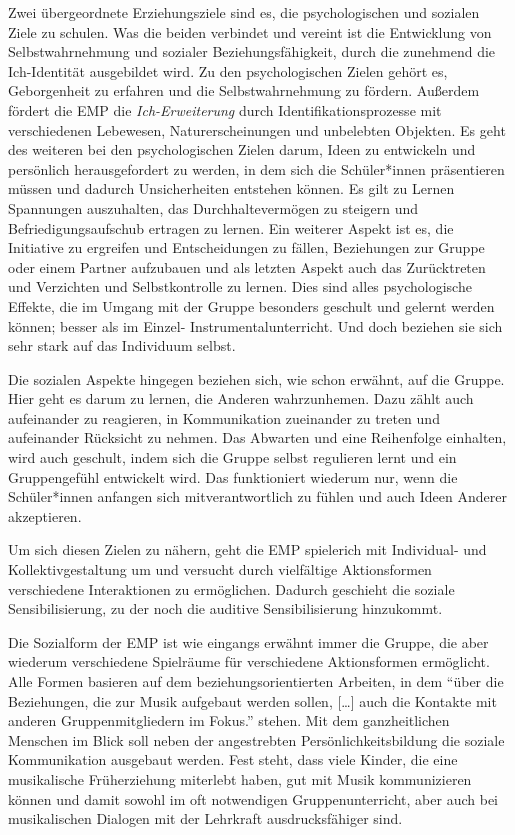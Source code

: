 Zwei übergeordnete Erziehungsziele sind es, die psychologischen und sozialen
Ziele zu schulen. Was die beiden verbindet und vereint ist die Entwicklung von
Selbstwahrnehmung und sozialer Beziehungsfähigkeit, durch die zunehmend die
Ich-Identität ausgebildet wird. Zu den psychologischen Zielen gehört es,
Geborgenheit zu erfahren und die Selbstwahrnehmung zu fördern. Außerdem fördert
die EMP die \emph{Ich-Erweiterung} durch Identifikationsprozesse mit
verschiedenen Lebewesen, Naturerscheinungen und unbelebten Objekten. Es geht des
weiteren bei den psychologischen Zielen darum, Ideen zu entwickeln und
persönlich herausgefordert zu werden, in dem sich die Schüler*innen präsentieren
müssen und dadurch Unsicherheiten entstehen können. Es gilt zu Lernen Spannungen
auszuhalten, das Durchhaltevermögen zu steigern und Befriedigungsaufschub
ertragen zu lernen. Ein weiterer Aspekt ist es, die Initiative zu ergreifen und
Entscheidungen zu fällen, Beziehungen zur Gruppe oder einem Partner aufzubauen
und als letzten Aspekt auch das Zurücktreten und Verzichten und Selbstkontrolle
zu lernen. Dies sind alles psychologische Effekte, die im Umgang mit der Gruppe
besonders geschult und gelernt werden können; besser als im Einzel-
Instrumentalunterricht. Und doch beziehen sie sich sehr stark auf das Individuum
selbst.

Die sozialen Aspekte hingegen beziehen sich, wie schon erwähnt, auf die Gruppe.
Hier geht es darum zu lernen, die Anderen wahrzunhemen. Dazu zählt auch
aufeinander zu reagieren, in Kommunikation zueinander zu treten und aufeinander
Rücksicht zu nehmen. Das Abwarten und eine Reihenfolge einhalten, wird auch
geschult, indem sich die Gruppe selbst regulieren lernt und ein Gruppengefühl
entwickelt wird. Das funktioniert wiederum nur, wenn die Schüler*innen anfangen
sich mitverantwortlich zu fühlen und auch Ideen Anderer akzeptieren.

Um sich diesen Zielen zu nähern, geht die EMP spielerich mit Individual- und
Kollektivgestaltung um und versucht durch vielfältige Aktionsformen verschiedene
Interaktionen zu ermöglichen. Dadurch geschieht die soziale Sensibilisierung, zu
der noch die auditive Sensibilisierung hinzukommt. 

Die Sozialform der EMP ist wie eingangs erwähnt immer die Gruppe, die aber
wiederum verschiedene Spielräume für verschiedene Aktionsformen ermöglicht. Alle
Formen basieren auf dem beziehungsorientierten Arbeiten, in dem \enquote{über
die Beziehungen, die zur Musik aufgebaut werden sollen, […] auch die Kontakte
mit anderen Gruppenmitgliedern im Fokus.}
\autocite[10]{dartsch:kern_des_musizierens} stehen. Mit dem ganzheitlichen
Menschen im Blick soll neben der angestrebten Persönlichkeitsbildung die soziale
Kommunikation ausgebaut werden. Fest steht, dass viele Kinder, die eine
musikalische Früherziehung miterlebt haben, gut mit Musik kommunizieren können
und damit sowohl im oft notwendigen Gruppenunterricht, aber auch bei
musikalischen Dialogen mit der Lehrkraft ausdrucksfähiger sind.


